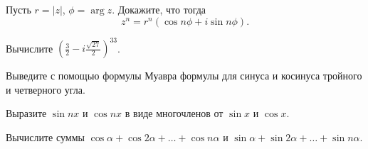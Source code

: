 \documentclass[a4paper, 12pt, num=21]{listok}
\begin{document}
\begin{problem}
	Пусть $r = |z|$, $\phi = \arg z$.
	Докажите, что тогда
	\[
		z^n = r^n (\cos{n\phi} + i \sin{n\phi}).
	\]
\end{problem}
\begin{problem}
	Вычислите ${\left ( \frac 3 2 - i \frac{\sqrt{27}}2 \right )}^{33}$.
\end{problem}
\begin{problem}
\begin{probparts}
	\item Выведите с помощью формулы Муавра формулы для синуса и косинуса тройного и четверного угла.
	\item Выразите $\sin{nx}$ и $\cos{nx}$ в виде многочленов от $\sin x$ и $\cos x$.
\end{probparts}
\end{problem}
\begin{problem}
	Вычислите суммы $\cos \alpha + \cos{2\alpha} + \ldots + \cos{n\alpha}$ и $\sin \alpha + \sin{2\alpha} + \ldots + \sin{n\alpha}$.
\end{problem}
\end{document}
